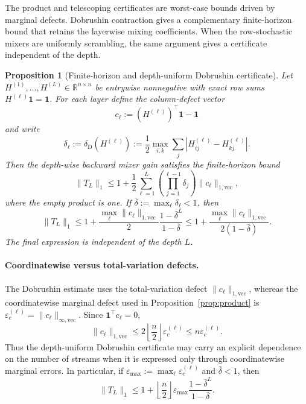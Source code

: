 \documentclass[10pt]{article}
\numberwithin{equation}{section}
\theoremstyle{plain}
\newtheorem{proposition}[theorem]{Proposition}
\theoremstyle{definition}
\theoremstyle{remark}
\newcommand{\R}{\mathbb{R}}
\newcommand{\ones}{\mathbf{1}}
\begin{document}
The product and telescoping certificates are worst-case bounds driven by marginal
defects. Dobrushin contraction gives a complementary finite-horizon bound that
retains the layerwise mixing coefficients. When the row-stochastic mixers are
uniformly scrambling, the same argument gives a certificate independent of
the depth.

\begin{proposition}[Finite-horizon and depth-uniform Dobrushin certificate]\label{prop:ergodic}
Let \(H^{(1)},\dots,H^{(L)}\in\R^{n\times n}\) be entrywise nonnegative with
exact row sums \(H^{(\ell)}\ones=\ones\). For each layer define the column-defect
vector
\[
        c_\ell:=(H^{(\ell)})^\top\ones-\ones
\]
and write
\[
        \delta_\ell
        :=\delta_{\mathrm D}(H^{(\ell)})
        :=
        \frac12\max_{i,k}\sum_j |H^{(\ell)}_{ij}-H^{(\ell)}_{kj}|.
\]
Then the depth-wise backward mixer gain satisfies the finite-horizon bound
\begin{equation}\label{eq:dobrushin-cert}
        \|T_L\|_1
        \le
        1+\frac12\sum_{\ell=1}^L
        \left(\prod_{j=1}^{\ell-1}\delta_j\right)
        \|c_\ell\|_{1,\mathrm{vec}},
\end{equation}
where the empty product is one. If
\(\bar\delta:=\max_\ell\delta_\ell<1\), then
\begin{equation}\label{eq:dobrushin-uniform-cert}
        \|T_L\|_1
        \le
        1+
        \frac{\max_\ell\|c_\ell\|_{1,\mathrm{vec}}}{2}
        \frac{1-\bar\delta^L}{1-\bar\delta}
        \le
        1+
        \frac{\max_\ell\|c_\ell\|_{1,\mathrm{vec}}}{2(1-\bar\delta)}.
\end{equation}
The final expression is independent of the depth \(L\).
\end{proposition}

\paragraph{Coordinatewise versus total-variation defects.}
The Dobrushin estimate uses the total-variation defect
\(\|c_\ell\|_{1,\mathrm{vec}}\), whereas the coordinatewise marginal defect used
in Proposition~\ref{prop:product} is
\(\varepsilon_c^{(\ell)}=\|c_\ell\|_{\infty,\mathrm{vec}}\). Since
\(\ones^\top c_\ell=0\),
\[
\|c_\ell\|_{1,\mathrm{vec}}
\le 2\left\lfloor\frac n2\right\rfloor\varepsilon_c^{(\ell)}
\le n\varepsilon_c^{(\ell)}.
\]
Thus the depth-uniform Dobrushin certificate may carry an explicit dependence
on the number of streams when it is expressed only through coordinatewise
marginal errors. In particular, if
\(\varepsilon_{\max}:=\max_\ell\varepsilon_c^{(\ell)}\) and
\(\bar\delta<1\), then
\begin{equation}\label{eq:dobrushin-eps-cert}
\|T_L\|_1
\le
1+\left\lfloor\frac n2\right\rfloor\varepsilon_{\max}
\frac{1-\bar\delta^L}{1-\bar\delta}.
\end{equation}
\end{document}
